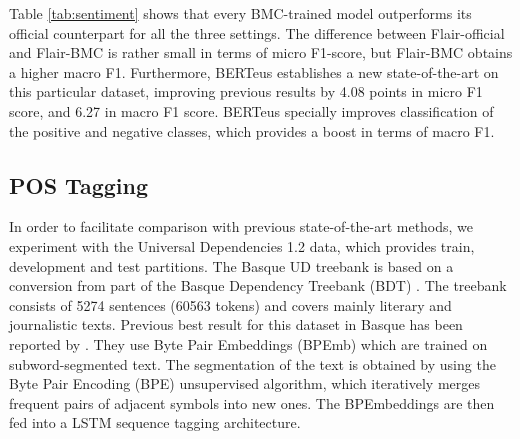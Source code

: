 \documentclass[10pt, a4paper]{article}
\begin{document}
Table \ref{tab:sentiment} shows that every BMC-trained model outperforms its official counterpart for all the three settings. The difference between Flair-official and Flair-BMC is rather small in terms of micro F1-score, but Flair-BMC obtains a higher macro F1. Furthermore, BERTeus establishes a new state-of-the-art on this particular dataset, improving previous results \cite{san2019multilingual} by 4.08 points in micro F1 score, and 6.27 in macro F1 score. BERTeus specially improves classification of the positive and negative classes, which provides a boost in terms of macro F1.

\subsection{POS Tagging}\label{sec:pos-tagging}

In order to facilitate comparison with previous state-of-the-art methods, we experiment with the Universal Dependencies 1.2 data, which provides train, development and test partitions. The Basque UD treebank \cite{aranzabe2015automatic} is based on a conversion from part of the Basque Dependency Treebank (BDT) \cite{aduriz2003construction}. The treebank consists of 5274 sentences (60563 tokens) and covers mainly literary and journalistic texts. Previous best result for this dataset in Basque has been reported by \cite{heinzerling-strube-2019-sequence}. They use Byte Pair Embeddings (BPEmb) which are trained on subword-segmented text. The segmentation of the text is obtained by using the Byte Pair Encoding (BPE) unsupervised algorithm, which iteratively merges frequent pairs of adjacent symbols into new ones. The BPEmbeddings are then fed into a LSTM sequence tagging architecture.

\end{document}
